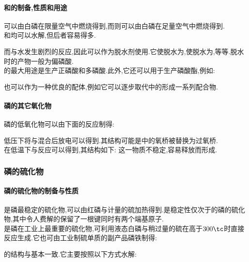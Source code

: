 \documentclass{ctexart}
\begin{document}
\paragraph{和的制备,性质和用途}
可以由白磷在限量空气中燃烧得到,而则可以由白磷在足量空气中燃烧得到.\\
\indent {}和均可以水解,但后者容易得多.
\begin{center}
\end{center}
而与水发生剧烈的反应,因此可以作为脱水剂使用.它使脱水为,使脱水为,等等.脱水时的产物一般为偏磷酸.\\
\indent {}的最大用途是生产正磷酸和多磷酸.此外,它还可以用于生产磷酸酯,例如:
\begin{center}
\end{center}

\indent {}也可以作为一种优良的配体,例如它可以逐步取代中的形成一系列配合物.
\paragraph{磷的其它氧化物} 磷的低氧化物可以由下面的反应制得:
\begin{center}
\end{center}

\indent 低压下将与混合后放电可以得到.其结构可能是中的氧桥被替换为过氧桥.\\
\indent {}在低温下与反应可以得到,其结构如下:
这一物质不稳定,容易释放而形成.
\subsubsection{磷的硫化物}
\paragraph{磷的硫化物的制备与性质}
是磷最稳定的硫化物,可以由红磷与计量的硫加热得到.是稳定性仅次于的磷的硫化物,其中令人费解的保留了一根键同时有两个端基原子.\\
\indent {}是磷在工业上最重要的硫化物,可利用液态白磷与稍过量的硫在高于$300\tc$时直接反应生成.它也可由工业制硫单质的副产品磷铁制得:
\begin{center}
\end{center}
的结构与基本一致.它主要按照以下方式水解:
\begin{center}
\end{center}
\end{document}
